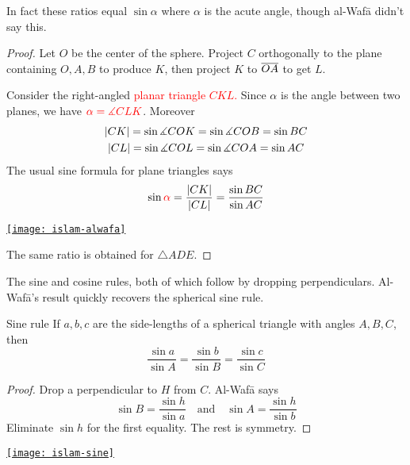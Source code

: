 In fact these ratios equal $\sin\alpha$ where $\alpha$ is the acute angle, though al-Wafā didn't say this.

\begin{proof}
	Let $O$ be the center of the sphere. Project $C$ orthogonally to the plane containing $O,A,B$ to produce $K$, then project $K$ to $\overline{OA}$ to get $L$.\par
	\begin{minipage}[t]{0.55\linewidth}\vspace{-5pt}
		Consider the right-angled \textcolor{red}{planar triangle $CKL$.} Since $\alpha$ is the angle between two planes, we have $\textcolor{red}{\alpha=\measuredangle CLK}$. Moreover
		\begin{gather*}
			\left| CK\right|=\sin\measuredangle COK=\sin\measuredangle COB=\sin BC\\
			\left| CL\right|=\sin\measuredangle COL=\sin\measuredangle COA=\sin AC
		\end{gather*}
		The usual sine formula for plane triangles says
		\[
			\sin\textcolor{red}{\alpha}=\frac{\left| CK\right|}{\left| CL\right|}=\frac{\sin BC}{\sin AC}
		\]
	\end{minipage}
	\hfill
	\begin{minipage}[t]{0.4\linewidth}\vspace{-15pt}
		\flushright
		\href{http://math.uci.edu/~ndonalds/math184/islam-alwafa.html}{\texttt{[image: islam-alwafa]}}
	\end{minipage}
	\par\vspace{-3pt}
	The same ratio is obtained for $\triangle ADE$.
\end{proof}

\goodbreak

The sine and cosine rules, both of which follow by dropping perpendiculars. Al-Wafā's result quickly recovers the spherical sine rule.

\begin{minipage}[t]{0.65\linewidth}\vspace{0pt}
	\begin{cor*}{Sine rule}{}
	If $a,b,c$ are the side-lengths of a spherical triangle with angles $A,B,C$, then
	\[\frac{\sin a}{\sin A}=\frac{\sin b}{\sin B}=\frac{\sin c}{\sin C}\]
	\end{cor*}
	
	\begin{proof}
	Drop a perpendicular to $H$ from $C$. Al-Wafā says
	\[\sin B=\frac{\sin h}{\sin a}\quad\text{and}\quad \sin A=\frac{\sin h}{\sin b}\]
	Eliminate $\sin h$ for the first equality. The rest is symmetry.
	\end{proof}
\end{minipage}
\hfill
\begin{minipage}[t]{0.34\linewidth}\vspace{0pt}
	\flushright
	\href{http://math.uci.edu/~ndonalds/math184/islam-sine.html}{\texttt{[image: islam-sine]}}
\end{minipage}
\medbreak

